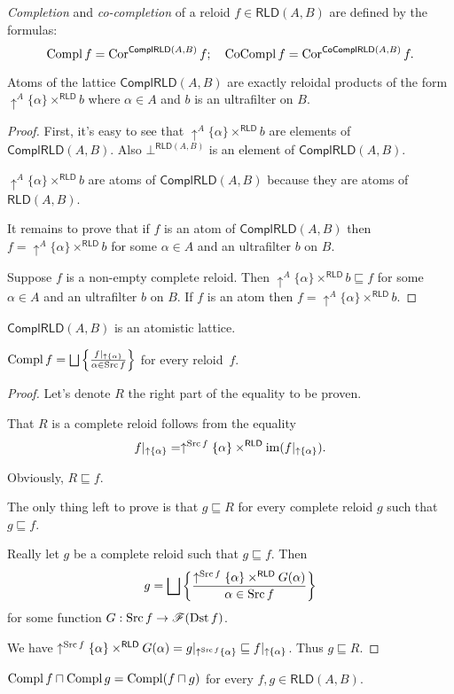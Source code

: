 \begin{defn}
\emph{Completion}
and \emph{co-completion} of a reloid $f\in\mathsf{RLD}(A,B)$ are
defined by the formulas:
\[
\operatorname{Compl} f=\operatorname{Cor}^{\mathsf{ComplRLD}(A,B)}f;\quad\operatorname{CoCompl} f=\operatorname{Cor}^{\mathsf{CoComplRLD}(A,B)}f.
\]
\end{defn}
\begin{thm}
Atoms of the lattice $\mathsf{ComplRLD}(A,B)$ are exactly reloidal
products of the form $\uparrow^{A}\{\alpha\}\times^{\mathsf{RLD}}b$
where $\alpha\in A$ and $b$ is an ultrafilter on $B$.\end{thm}
\begin{proof}
First, it's easy to see that $\uparrow^{A}\{\alpha\}\times^{\mathsf{RLD}}b$
are elements of $\mathsf{ComplRLD}(A,B)$. Also $\bot^{\mathsf{RLD}(A,B)}$
is an element of $\mathsf{ComplRLD}(A,B)$.

$\uparrow^{A}\{\alpha\}\times^{\mathsf{RLD}}b$ are atoms of $\mathsf{ComplRLD}(A,B)$
because they are atoms of $\mathsf{RLD}(A,B)$.

It remains to prove that if $f$ is an atom of $\mathsf{ComplRLD}(A,B)$
then $f=\uparrow^{A}\{\alpha\}\times^{\mathsf{RLD}}b$ for some $\alpha\in A$
and an ultrafilter $b$ on $B$.

Suppose $f$ is a non-empty complete reloid. Then $\uparrow^{A}\{\alpha\}\times^{\mathsf{RLD}}b\sqsubseteq f$
for some $\alpha\in A$ and an ultrafilter $b$ on $B$. If $f$ is
an atom then $f=\uparrow^{A}\{\alpha\}\times^{\mathsf{RLD}}b$.\end{proof}
\begin{obvious}
$\mathsf{ComplRLD}(A,B)$ is an atomistic lattice.\end{obvious}
\begin{prop}
$\Compl f=\bigsqcup\setcond{f|_{\uparrow \{\alpha\}}}{\alpha\in\Src f}$
for every reloid~$f$.\end{prop}
\begin{proof}
Let's denote $R$ the right part of the equality to be proven.

That $R$ is a complete reloid follows from the equality
\[
f|_{\uparrow \{\alpha\}}=\uparrow^{\operatorname{Src} f}\{\alpha\}\times^{\mathsf{RLD}}\operatorname{im}(f|_{\uparrow \{\alpha\}}).
\]

Obviously, $R\sqsubseteq f$.

The only thing left to prove is that $g\sqsubseteq R$ for every complete
reloid $g$ such that $g\sqsubseteq f$.

Really let $g$ be a complete reloid such that $g\sqsubseteq f$.
Then
\[
g=\bigsqcup\setcond{\uparrow^{\Src f}\{\alpha\}\times^{\mathsf{RLD}}G(\alpha)}{\alpha\in\Src f}
\]
for some function $G:\operatorname{Src} f\rightarrow\mathscr{F}(\operatorname{Dst} f)$.

We have $\uparrow^{\operatorname{Src} f}\{\alpha\}\times^{\mathsf{RLD}}G(\alpha)=g|_{\uparrow^{\operatorname{Src} f}\{\alpha\}}\sqsubseteq f|_{\uparrow \{\alpha\}}$.
Thus $g\sqsubseteq R$.\end{proof}
\begin{conjecture}\label{compl-rld-intrs}
$\operatorname{Compl} f\sqcap\operatorname{Compl} g=\operatorname{Compl}(f\sqcap g)$ for every $f,g\in\mathsf{RLD}(A,B)$.\end{conjecture}

